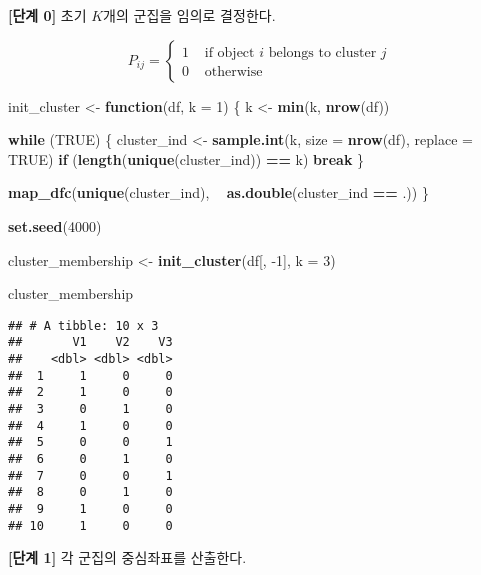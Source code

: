 \documentclass[]{book}
\newenvironment{Shaded}{\begin{snugshade}}{\end{snugshade}}
\newcommand{\ControlFlowTok}[1]{\textcolor[rgb]{0.13,0.29,0.53}{\textbf{#1}}}
\newcommand{\DataTypeTok}[1]{\textcolor[rgb]{0.13,0.29,0.53}{#1}}
\newcommand{\DecValTok}[1]{\textcolor[rgb]{0.00,0.00,0.81}{#1}}
\newcommand{\KeywordTok}[1]{\textcolor[rgb]{0.13,0.29,0.53}{\textbf{#1}}}
\newcommand{\NormalTok}[1]{#1}
\newcommand{\OperatorTok}[1]{\textcolor[rgb]{0.81,0.36,0.00}{\textbf{#1}}}
\newcommand{\OtherTok}[1]{\textcolor[rgb]{0.56,0.35,0.01}{#1}}
\newcommand{\StringTok}[1]{\textcolor[rgb]{0.31,0.60,0.02}{#1}}
\begin{document}
\textbf{{[}단계 0{]}} 초기 \(K\)개의 군집을 임의로 결정한다.

\begin{equation*}
P_{ij} = \begin{cases}
1 & \text{ if object $i$ belongs to cluster $j$}\\
0 & \text{ otherwise}
\end{cases}
\end{equation*}

\begin{Shaded}
\begin{Highlighting}[]
\NormalTok{init_cluster <-}\StringTok{ }\ControlFlowTok{function}\NormalTok{(df, }\DataTypeTok{k =} \DecValTok{1}\NormalTok{) \{}
\NormalTok{  k <-}\StringTok{ }\KeywordTok{min}\NormalTok{(k, }\KeywordTok{nrow}\NormalTok{(df))}
  
  \ControlFlowTok{while}\NormalTok{ (}\OtherTok{TRUE}\NormalTok{) \{}
\NormalTok{    cluster_ind <-}\StringTok{ }\KeywordTok{sample.int}\NormalTok{(k, }\DataTypeTok{size =} \KeywordTok{nrow}\NormalTok{(df), }\DataTypeTok{replace =} \OtherTok{TRUE}\NormalTok{)}
    \ControlFlowTok{if}\NormalTok{ (}\KeywordTok{length}\NormalTok{(}\KeywordTok{unique}\NormalTok{(cluster_ind)) }\OperatorTok{==}\StringTok{ }\NormalTok{k) }\ControlFlowTok{break}
\NormalTok{  \}}
  
  \KeywordTok{map_dfc}\NormalTok{(}\KeywordTok{unique}\NormalTok{(cluster_ind), }\OperatorTok{~}\StringTok{ }\KeywordTok{as.double}\NormalTok{(cluster_ind }\OperatorTok{==}\StringTok{ }\NormalTok{.))}
\NormalTok{\}}

\KeywordTok{set.seed}\NormalTok{(}\DecValTok{4000}\NormalTok{)}

\NormalTok{cluster_membership <-}\StringTok{ }\KeywordTok{init_cluster}\NormalTok{(df[, }\DecValTok{-1}\NormalTok{], }\DataTypeTok{k =} \DecValTok{3}\NormalTok{)}

\NormalTok{cluster_membership}
\end{Highlighting}
\end{Shaded}

\begin{verbatim}
## # A tibble: 10 x 3
##       V1    V2    V3
##    <dbl> <dbl> <dbl>
##  1     1     0     0
##  2     1     0     0
##  3     0     1     0
##  4     1     0     0
##  5     0     0     1
##  6     0     1     0
##  7     0     0     1
##  8     0     1     0
##  9     1     0     0
## 10     1     0     0
\end{verbatim}

\textbf{{[}단계 1{]}} 각 군집의 중심좌표를 산출한다.
\end{document}
